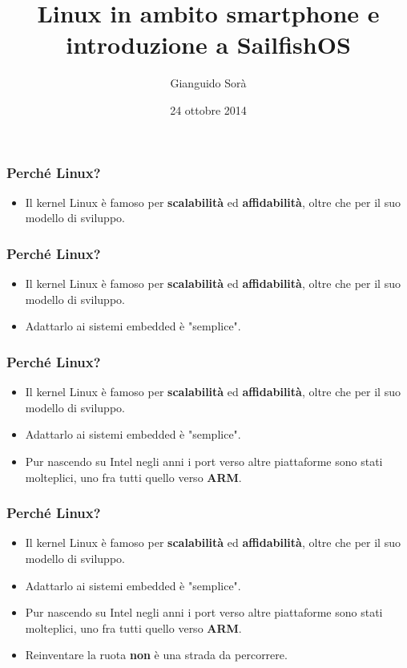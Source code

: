 \documentclass[12pt]{beamer}
\author{Gianguido Sorà}
\title{Linux in ambito smartphone e introduzione a SailfishOS}
\institute
{
  \medskip
    \textit{gianguidorama@gmail.com} 
}
\date{24 ottobre 2014}
\begin{document}
\maketitle

\begin{frame}
\frametitle{Perché Linux?}
\begin{itemize}
\item Il kernel Linux è famoso per \textbf{scalabilità} ed \textbf{affidabilità}, oltre che per il suo modello di sviluppo.
\end{itemize}
\end{frame}

\begin{frame}
\frametitle{Perché Linux?}
\begin{itemize}
\item Il kernel Linux è famoso per \textbf{scalabilità} ed \textbf{affidabilità}, oltre che per il suo modello di sviluppo.
\item Adattarlo ai sistemi embedded è "semplice".
\end{itemize}
\end{frame}

\begin{frame}
\frametitle{Perché Linux?}
\begin{itemize}
\item Il kernel Linux è famoso per \textbf{scalabilità} ed \textbf{affidabilità}, oltre che per il suo modello di sviluppo.
\item Adattarlo ai sistemi embedded è "semplice".
\item Pur nascendo su Intel negli anni i port verso altre piattaforme sono stati molteplici, uno fra tutti quello verso \textbf{ARM}.
\end{itemize}
\end{frame}

\begin{frame}
\frametitle{Perché Linux?}
\begin{itemize}
\item Il kernel Linux è famoso per \textbf{scalabilità} ed \textbf{affidabilità}, oltre che per il suo modello di sviluppo.
\item Adattarlo ai sistemi embedded è "semplice".
\item Pur nascendo su Intel negli anni i port verso altre piattaforme sono stati molteplici, uno fra tutti quello verso \textbf{ARM}.
\item Reinventare la ruota \textbf{non} è una strada da percorrere.
\end{itemize}
\end{frame}
\end{document}
